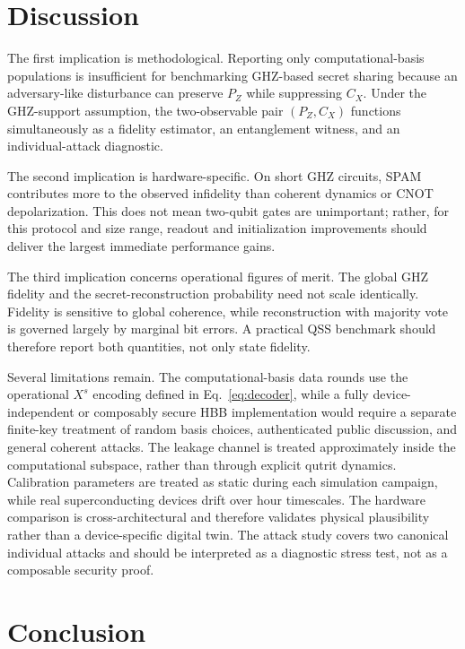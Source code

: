 \documentclass[aip,amsmath,amssymb,reprint,longbibliography]{revtex4-2}
\begin{document}
\section{Discussion}
\label{sec:discussion}

The first implication is methodological.  Reporting only computational-basis populations is insufficient for benchmarking GHZ-based secret sharing because an adversary-like disturbance can preserve $P_Z$ while suppressing $C_X$.  Under the GHZ-support assumption, the two-observable pair $(P_Z,C_X)$ functions simultaneously as a fidelity estimator, an entanglement witness, and an individual-attack diagnostic.

The second implication is hardware-specific.  On short GHZ circuits, SPAM contributes more to the observed infidelity than coherent dynamics or CNOT depolarization.  This does not mean two-qubit gates are unimportant; rather, for this protocol and size range, readout and initialization improvements should deliver the largest immediate performance gains.

The third implication concerns operational figures of merit.  The global GHZ fidelity and the secret-reconstruction probability need not scale identically.  Fidelity is sensitive to global coherence, while reconstruction with majority vote is governed largely by marginal bit errors.  A practical QSS benchmark should therefore report both quantities, not only state fidelity.

Several limitations remain.  The computational-basis data rounds use the operational $X^s$ encoding defined in Eq.~\eqref{eq:decoder}, while a fully device-independent or composably secure HBB implementation would require a separate finite-key treatment of random basis choices, authenticated public discussion, and general coherent attacks.  The leakage channel is treated approximately inside the computational subspace, rather than through explicit qutrit dynamics.  Calibration parameters are treated as static during each simulation campaign, while real superconducting devices drift over hour timescales.  The hardware comparison is cross-architectural and therefore validates physical plausibility rather than a device-specific digital twin.  The attack study covers two canonical individual attacks and should be interpreted as a diagnostic stress test, not as a composable security proof.

\section{Conclusion}
\label{sec:conclusion}
\end{document}
